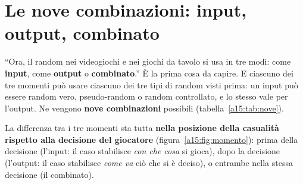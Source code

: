 \section{Le nove combinazioni: input, output, combinato}
\label{a15:sec:nove}

``Ora, il random nei videogiochi e nei giochi da tavolo si usa in tre modi: come
\textbf{input}, come \textbf{output} o \textbf{combinato}.'' È la prima cosa da capire. E
ciascuno dei tre momenti può usare ciascuno dei tre tipi di random visti prima: un input
può essere random vero, pseudo-random o random controllato, e lo stesso vale per l'output.
Ne vengono \textbf{nove combinazioni} possibili (tabella~\ref{a15:tab:nove}).

La differenza tra i tre momenti sta tutta \textbf{nella posizione della casualità rispetto
alla decisione del giocatore} (figura~\ref{a15:fig:momento}): prima della decisione
(l'input: il caso stabilisce \emph{con che cosa} si gioca), dopo la decisione (l'output:
il caso stabilisce \emph{come va} ciò che si è deciso), o entrambe nella stessa decisione
(il combinato).

